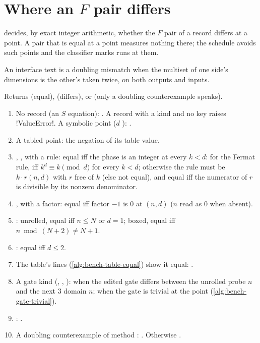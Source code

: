 \section{Where an \texorpdfstring{$F$}{F} pair differs}\label{sec:bench-differs}

 decides, by exact integer arithmetic, whether the $F$ pair of a
record differs at a point. A pair that is equal at a point measures nothing there; the schedule
avoids such points and the classifier marks runs at them.

\begin{definition}\label{def:bench-doubling}
An interface text  is a doubling mismatch when the
multiset of one side's dimensions is the other's taken twice, on both outputs and inputs.
\end{definition}

\begin{algorithm}\label{alg:bench-equal-at}
Returns  (equal),  (differs), or  (only a doubling
counterexample speaks).
\begin{enumerate}
\item No record (an $S$ equation): . A record with a kind and no 
  key raises \py!ValueError!. A symbolic point ($d$ ): .
\item A tabled point: the negation of its table value.
\item {}, ,  with a rule: equal iff the
  phase is an integer at every $k<d$: for the Fermat rule, iff $k^d\equiv k\pmod d$ for every
  $k<d$; otherwise the rule must be $k\cdot r(n,d)$ with $r$ free of $k$ (else not equal), and
  equal iff the numerator of $r$ is divisible by its nonzero denominator.
\item {},  with a factor: equal iff factor $-1$ is 0 at
  $(n,d)$ ($n$ read as 0 when absent).
\item {}: unrolled, equal iff $n\le N$ or $d=1$; boxed, equal iff
  $n\bmod(N+2)\ne N+1$.
\item {}: equal iff $d\le2$.
\item The table's lines (\cref{alg:bench-table-equal}) show it equal: .
\item A gate kind (, , ):
   when the edited gate differs between the unrolled probe $n$ and the next 3 domain
  $n$;  when the gate is trivial at the point (\cref{alg:bench-gate-trivial}).
\item {}: .
\item A doubling counterexample of method : . Otherwise .
\end{enumerate}
\end{algorithm}

